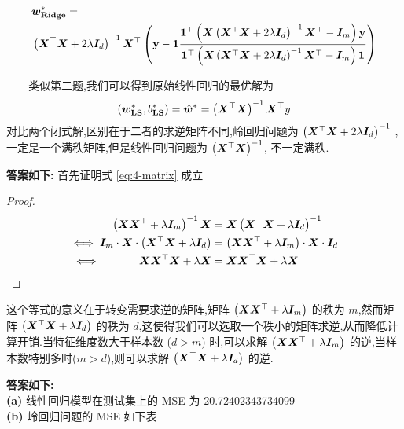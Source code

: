 \documentclass[answers]{exam}  %
\begin{document}
\begin{questions}
\begin{solution}
		\begin{equation*}
			\begin{aligned}
				 & \boldsymbol{w}_{\mathbf{Ridge}}^{*}=                                                                                                                                                                                                                                                           \\
				 & \left(\boldsymbol{X}^\top\boldsymbol{X}+2\lambda\boldsymbol{I}_d\right)^{-1}\boldsymbol{X}^\top\left(\mathbf{y}-\boldsymbol{1} \frac{\boldsymbol{1}^\top\left(\boldsymbol{X}\left(\boldsymbol{X}^\top\boldsymbol{X}+2\lambda\boldsymbol{I}_d\right)^{-1}\boldsymbol{X}^\top-\boldsymbol{I}_m\right)\mathbf y}{\boldsymbol{1}^\top\left(\boldsymbol{X}\left(\boldsymbol{X}^\top\boldsymbol{X}+2\lambda\boldsymbol{I}_d\right)^{-1}\boldsymbol{X}^\top-\boldsymbol{I}_m\right)\boldsymbol{1}}\right)
			\end{aligned}
		\end{equation*}
		\begin{description}
			\item
			      \ \ \ \ 类似第二题,我们可以得到原始线性回归的最优解为
			      \begin{equation*}
				      \left(\boldsymbol{w}_{\mathbf{LS}}^*, b_{\mathbf{LS}}^*\right) = \hat{\boldsymbol{w}}^*=\left(\boldsymbol{X}^\top\boldsymbol{X}\right)^{-1}\boldsymbol{X}^\top y
			      \end{equation*}
			      对比两个闭式解,区别在于二者的求逆矩阵不同,岭回归问题为  $\left(\boldsymbol{X}^\top\boldsymbol{X}+2\lambda\boldsymbol{I}_d\right)^{-1}$ ,一定是一个满秩矩阵,但是线性回归问题为 $\left(\boldsymbol{X}^\top\boldsymbol{X}\right)^{-1}$, 不一定满秩.
			\item[2.] \textbf{答案如下:}
			      首先证明式 \ref{eq:4-matrix} 成立
			      \begin{proof}
				      \begin{align*}
					      \left(\boldsymbol{X} \boldsymbol{X}^{\top}+\lambda \boldsymbol{I}_m\right)^{-1} \boldsymbol{X}                  & =\boldsymbol{X}\left(\boldsymbol{X}^{\top} \boldsymbol{X}+\lambda \boldsymbol{I}_d\right)^{-1}              \\
					      \iff \boldsymbol{I}_m\cdot \boldsymbol{X}\cdot \left(\boldsymbol{X}^{\top} \boldsymbol{X}+\lambda \boldsymbol{I}_d\right) & = \left(\boldsymbol{X} \boldsymbol{X}^{\top}+\lambda \boldsymbol{I}_m\right)\cdot \boldsymbol{X}\cdot\boldsymbol{I}_d \\
					      \iff\quad\quad\quad\ \boldsymbol{X}\boldsymbol{X}^\top\boldsymbol{X}+\lambda \boldsymbol{X}                      & = \boldsymbol{X}\boldsymbol{X}^\top\boldsymbol{X}+\lambda \boldsymbol{X}
				      \end{align*}
			      \end{proof}
			      这个等式的意义在于转变需要求逆的矩阵,矩阵 $\left(\boldsymbol{X} \boldsymbol{X}^{\top}+\lambda \boldsymbol{I}_m\right)$ 的秩为 $m$,然而矩阵 $\left(\boldsymbol{X}^{\top} \boldsymbol{X}+\lambda \boldsymbol{I}_d\right)$ 的秩为 $d$,这使得我们可以选取一个秩小的矩阵求逆,从而降低计算开销.当特征维度数大于样本数 ($d>m$) 时,可以求解 $\left(\boldsymbol{X} \boldsymbol{X}^{\top}+\lambda \boldsymbol{I}_m\right)$ 的逆,当样本数特别多时($m>d$),则可以求解 $\left(\boldsymbol{X}^{\top} \boldsymbol{X}+\lambda \boldsymbol{I}_d\right)$ 的逆.
			\item[3.] \textbf{答案如下:}\\
			      \textbf{(a)} 线性回归模型在测试集上的 MSE 为  20.72402343734099\\
			      \textbf{(b)} 岭回归问题的 MSE 如下表\\


\end{description}
\end{solution}
\end{questions}
\end{document}
